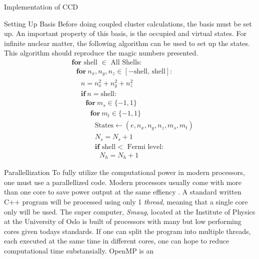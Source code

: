 \documentclass[twoside,english]{uiofysmaster}
\begin{document}
\begin{chapter}{Implementation of CCD}
	\begin{section}{Setting Up Basis}
		Before doing coupled cluster calculations, the basis must be set up. An important property of this basis, is the occupied and virtual states. For infinite nuclear matter, the following algorithm can be used to set up the states. This algorithm should reproduce the magic numbers presented. 
		\begin{align*}
			&\mathbf{for } \text{ shell } \in \text{ All Shells}: \\
			&\:\:\:\mathbf{for } \: n_x, n_y, n_z \in [-\text{shell, shell} ]: \\
			&\:\:\:\:\:\:n = n_x^2 + n_y^2 + n_z^2 \\
			&\:\:\:\:\:\:\mathbf{if }\: n = \text{shell}: \\
			&\:\:\:\:\:\:\:\:\:\mathbf{for } \: m_s \in \{-1,1\} \\
			&\:\:\:\:\:\:\:\:\:\:\:\: \mathbf{for } \: m_t \in \{-1,1\} \\
			&\:\:\:\:\:\:\:\:\:\:\:\:\:\:\:\text{States} \leftarrow (e, n_x, n_y, n_z, m_s, m_t) \\
			&\:\:\:\:\:\:\:\:\:\:\:\:\:\:\:N_s = N_s + 1 \\
			&\:\:\:\:\:\:\:\:\:\:\:\:\:\:\:\mathbf{if } \text{ shell} < \text{ Fermi level}: \\
			&\:\:\:\:\:\:\:\:\:\:\:\:\:\:\:\:\:\: N_h = N_h + 1
		\end{align*}
	\end{section}

	\begin{section}{Parallellization}
		To fully utilize the computational power in modern processors, one must use a parallellized code. Modern processors usually come with more than one core to save power output at the same effiency \cite{IntelOpenMP}. A standard written C++ program will be processed using only 1 \textit{thread}, meaning that a single core only will be used. The super computer, \textit{Smaug}, located at the Institute of Physics at the University of Oslo is built of processors with many but low performing cores given todays standards. If one can split the program into multiple threads, each executed at the same time in different cores, one can hope to reduce computational time substansially. OpenMP is an 
	\end{section}

\end{chapter}
\end{document}
